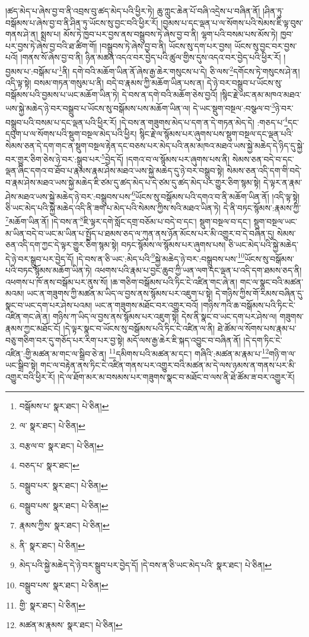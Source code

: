 །ཚད་མེད་པ་ཞེས་བྱ་བ་ནི་འབྲས་བུ་ཚད་མེད་པའི་ཕྱིར་ཏེ། ཆུ་ཀླུང་ཆེན་པོ་བཞི་འདྲེས་པ་བཞིན་ནོ། །ཤིན་ཏུ་བསྒོམས་པ་ཞེས་བྱ་བ་ནི་ཤིན་ཏུ་ཡོངས་སུ་བྱང་བའི་ཕྱིར་རོ། །བྱམས་པ་དང་ལྡན་པ་ལ་སོགས་པའི་སེམས་ཇི་ལྟ་བུས་གནས་ཤེ་ན། སྨྲས་པ། མོས་ཏེ་ཁྱབ་པར་བྱས་ནས་བསྒྲུབས་ཏེ་ཞེས་བྱ་བ་ནི། ལྷག་པའི་བསམ་པས་མོས་ཏེ། ཁྱབ་པར་བྱས་ཏེ་ཞེས་བྱ་བའི་ཐ་ཚིག་གོ། །བསྒྲུབས་ཏེ་ཞེས་བྱ་བ་ནི། ཡོངས་སུ་དག་པར་བྱས། ཡོངས་སུ་བྱང་བར་བྱས་པའོ། །གནས་སོ་ཞེས་བྱ་བ་ནི། ཉིན་མཚན་འདའ་བར་བྱེད་པའི་ཚུལ་གྱིས་དུས་འདའ་བར་བྱེད་པའི་ཕྱིར་རོ། །
བྱམས་པ་:བསྒོམ་པ་\footnote{བསྒོམས་པ་  སྣར་ཐང་།  པེ་ཅིན། }ནི། དགེ་བའི་མཆོག་ཡིན་ནོ་ཞེས་རྒྱ་ཆེར་གསུངས་པ་དེ། ཅི་ལས་\footnote{ལ་  སྣར་ཐང་།  པེ་ཅིན། }དགོངས་ཏེ་གསུངས་ཤེ་ན། འདི་ལྟ་སྟེ། བསམ་གཏན་གསུམ་པ་ནི། བདེ་བ་རྣམས་ཀྱི་མཆོག་ཡིན་པས་ན། དེ་ཉེ་བར་བསྒྲུབ་པ་ཡོངས་སུ་བསྒོམས་པའི་བྱམས་པ་ཡང་མཆོག་ཡིན་ཏེ། དེ་བས་ན་དགེ་བའི་མཆོག་ཅེས་བྱའོ། །སྙིང་རྗེ་ཡང་ནམ་མཁའ་མཐའ་ཡས་སྐྱེ་མཆེད་ཉེ་བར་བསྒྲུབ་པ་ཡོངས་སུ་བསྒོམས་པས་མཆོག་ཡིན་ལ། དེ་ཡང་སྡུག་བསྔལ་:བསྩལ་བ་\footnote{བརྩལ་བ་  སྣར་ཐང་།  པེ་ཅིན། }ཉེ་བར་བསྒྲུབ་པའི་བསམ་པ་དང་ལྡན་པའི་ཕྱིར་རོ། །དེ་བས་ན་གཟུགས་མེད་པ་དག་ན་དེ་གཏན་མེད་དེ། :གཅད་པ་\footnote{བཅད་པ་  སྣར་ཐང་། }དང་དབུག་པ་ལ་སོགས་པའི་སྡུག་བསྔལ་མེད་པའི་ཕྱིར། སྙིང་རྗེ་ལ་སྙོམས་པར་ཞུགས་པས་སྡུག་བསྔལ་དང་ལྡན་པའི་སེམས་ཅན་དེ་དག་གང་ན་སྡུག་བསྔལ་རྟེན་དང་བཅས་པར་མེད་པའི་ནམ་མཁའ་མཐའ་ཡས་སྐྱེ་མཆེད་དེ་ཉིད་དུ་སྐྱེ་བར་གྱུར་ཅིག་ཅེས་ཉེ་བར་:སྒྲུབ་པར་\footnote{བསྒྲུབ་པར་  སྣར་ཐང་།  པེ་ཅིན། }བྱེད་དོ། །དགའ་བ་ལ་སྙོམས་པར་ཞུགས་པས་ནི། སེམས་ཅན་བདེ་བ་དང་ལྡན་ཞིང་དགའ་བ་ཐོབ་པ་རྣམས་རྣམ་ཤེས་མཐའ་ཡས་སྐྱེ་མཆེད་དུ་ཉེ་བར་བསྒྲུབ་སྟེ། སེམས་ཅན་འདི་དག་གི་བདེ་བ་རྣམ་ཤེས་མཐའ་ཡས་སྐྱེ་མཆེད་ཇི་ཙམ་དུ་ཚད་མེད་པ་དེ་ཙམ་དུ་ཚད་མེད་པར་གྱུར་ཅིག་སྙམ་སྟེ། དེ་ལྟར་ན་རྣམ་ཤེས་མཐའ་ཡས་སྐྱེ་མཆེད་ཉེ་བར་:བསྒྲུབས་པས་\footnote{བསྒྲུབ་པས་  སྣར་ཐང་།  པེ་ཅིན། }ཡོངས་སུ་བསྒོམས་པའི་དགའ་བ་ནི་མཆོག་ཡིན་ནོ། །འདི་ལྟ་སྟེ། ཅི་ཡང་མེད་པའི་སྐྱེ་མཆེད་འདི་ནི་ཟག་པ་མེད་པའི་སེམས་ཀྱིས་སའི་མཐའ་ཡིན་ཏེ། དེ་ནི་བཏང་སྙོམས་:རྣམས་ཀྱི་\footnote{རྣམས་ཀྱིས་  སྣར་ཐང་།  པེ་ཅིན། }མཆོག་ཡིན་ནོ། །དེ་བས་ན་\footnote{ནི་  སྣར་ཐང་།  པེ་ཅིན། }ཇི་ལྟར་དགེ་སློང་དགྲ་བཅོམ་པ་བདེ་བ་དང་། སྡུག་བསྔལ་བ་དང་། སྡུག་བསྔལ་ཡང་མ་ཡིན་བདེ་བ་ཡང་མ་ཡིན་པ་སྤྱོད་པ་ཐམས་ཅད་ལ་ཀུན་ནས་ཉོན་མོངས་པར་མི་འགྱུར་བ་དེ་བཞིན་དུ། སེམས་ཅན་འདི་དག་ཀྱང་དེ་ལྟར་གྱུར་ཅིག་སྙམ་སྟེ། བཏང་སྙོམས་ལ་སྙོམས་པར་ཞུགས་པས། ཅི་ཡང་མེད་པའི་སྐྱེ་མཆེད་དེ་ཉེ་བར་སྒྲུབ་པར་བྱེད་དོ། །དེ་བས་ན་ཅི་ཡང་:མེད་པའི་\footnote{མེད་པའི་སྐྱེ་མཆེད་དེ་ཉེ་བར་སྒྲུབ་པར་བྱེད་དོ། །དེ་བས་ན་ཅི་ཡང་མེད་པའི་  སྣར་ཐང་།  པེ་ཅིན། }སྐྱེ་མཆེད་ཉེ་བར་:བསྒྲུབས་པས་\footnote{བསྒྲུབ་པས་  སྣར་ཐང་།  པེ་ཅིན། }ཡོངས་སུ་བསྒོམས་པའི་བཏང་སྙོམས་མཆོག་ཡིན་ཏེ། འཕགས་པའི་རྣམ་པ་བྱང་ཆུབ་ཀྱི་ཡན་ལག་དང་ལྡན་པ་འདི་དག་ཐམས་ཅད་ནི། འཕགས་པ་ཁོ་ནས་བསྒོམ་པར་ནུས་སོ། །ཆ་གཅིག་བསྒོམས་པའི་ཏིང་ངེ་འཛིན་གང་ཞེ་ན། གང་ལ་སྣང་བའི་མཚན་མའམ། ཡང་ན་གཟུགས་ཀྱི་མཚན་མ་ཡིད་ལ་བྱས་ནས་སྙོམས་པར་འཇུག་པ་སྟེ། དེ་གཉིས་ཀྱིས་གོ་རིམས་བཞིན་དུ་སྣང་བ་ཡང་དག་པར་ཤེས་པའམ། ཡང་ན་གཟུགས་མཐོང་བར་འགྱུར་བའོ། །གཉིས་ཀའི་ཆ་བསྒོམས་པའི་ཏིང་ངེ་འཛིན་གང་ཞེ་ན། གཉིས་ཀ་ཡིད་ལ་བྱས་ནས་སྙོམས་པར་འཇུག་སྟེ། དེས་ནི་སྣང་བ་ཡང་དག་པར་ཤེས་ལ། གཟུགས་རྣམས་ཀྱང་མཐོང་ངོ། །དེ་ལྟར་སྣང་བ་ཡོངས་སུ་བསྒོམས་པའི་ཏིང་ངེ་འཛིན་ལ་ནི། ཐེ་ཚོམ་ལ་སོགས་པས་རྣམ་པ་བཅུ་གཅིག་བར་དུ་གཅོད་པར་རིག་པར་བྱ་སྟེ། མདོ་ལས་རྒྱ་ཆེར་ཇི་སྐད་འབྱུང་བ་བཞིན་ནོ། །དེ་དག་ཏིང་ངེ་འཛིན་:གྱི་མཚན་མ་གང་ལ་སྒྲིབ་ཅེ་ན། \footnote{གྱི་  སྣར་ཐང་།  པེ་ཅིན། }དམིགས་པའི་མཚན་མ་དང་། གཞིའི་:མཚན་མ་རྣམ་པ་\footnote{མཚན་མ་རྣམས་  སྣར་ཐང་།  པེ་ཅིན། }གཉི་ག་ལ་ཡང་སྒྲིབ་སྟེ། གང་ལ་བརྟེན་ནས་ཏིང་ངེ་འཛིན་གནས་པར་འགྱུར་བའི་མཚན་མ་དེ་ལས་ཉམས་ན་གནས་པར་མི་འགྱུར་བའི་ཕྱིར་རོ། །དེ་ལ་ཐོག་མར་མ་བསམས་པར་གཟུགས་སྣང་བ་མཐོང་བ་ལས་ནི་ཐེ་ཚོམ་ཟ་བར་འགྱུར་རོ། 